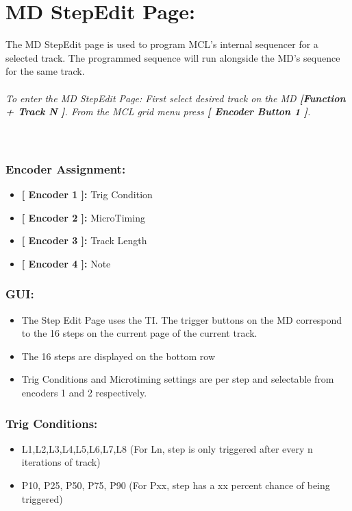 \chapter{MD StepEdit Page:}

The MD StepEdit page is used to program MCL's  internal sequencer for a selected track. The programmed sequence will run alongside the MD's sequence for the same track.\\
\\\textit{To enter the MD StepEdit Page: First select desired track on the MD \textbf{[Function + Track N ]}. From the MCL grid menu press \textbf{[ Encoder Button 1 ]}.}\\
\\
\\
\subsection{Encoder Assignment:}
\begin{itemize}
	\item \textbf{[ Encoder 1 ]: } Trig Condition
	\item \textbf{[ Encoder 2 ]: } MicroTiming
	\item \textbf{[ Encoder 3 ]: } Track Length
	\item \textbf{[ Encoder 4 ]: } Note
\end{itemize}
\subsection{GUI:}
\begin{itemize}
\item The Step Edit Page uses the TI. The trigger buttons on the MD correspond to the 16 steps on the current page of the current track.
\item The 16 steps are displayed on the bottom row
\item Trig Conditions and Microtiming settings are per step and selectable from encoders 1 and 2 respectively.
\end{itemize}
\subsection{Trig Conditions:}
\begin{itemize}
\item L1,L2,L3,L4,L5,L6,L7,L8 (For Ln, step is only triggered after every n iterations of track)
\item P10, P25, P50, P75, P90 (For Pxx, step has a xx percent chance of being triggered)
\end{itemize}
